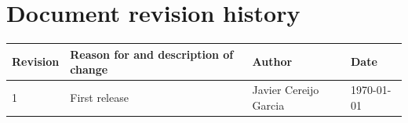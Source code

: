 \documentclass[11pt
  , a4paper
  , article
  , oneside
  , showtrims
]{memoir}
\begin{document}
%
%
%

%


\chapter*{Document revision history}\label{sec:docrevhist}
\begin{table}[!tbh]
  \footnotesize
  \centering
  \begin{tabular}{llll}
    \toprule
    \textbf{Revision} & \textbf{Reason for and description of change} & \textbf{Author}       & \textbf{Date} \\\midrule
    1                 & First release                                 & Javier Cereijo Garcia & \today        \\
    \bottomrule
  \end{tabular}
  \label{table:docrevhist}
\end{table}
\end{document}
